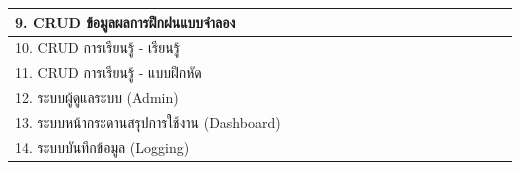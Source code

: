 \documentclass[12pt,oneside,openright,a4paper]{cpe-thai-project}
\begin{document}
\begin{enumerate}
\begin{table}[h]
\begin{tabular}{|lllll|llll|llll|llll|llll|}
\multicolumn{5}{|l|}{\cellcolor[HTML]{FFFFFF}9. CRUD ข้อมูลผลการฝึกฝนแบบจำลอง} & \multicolumn{1}{l|}{} & \multicolumn{1}{l|}{} & \multicolumn{1}{l|}{} &  & \multicolumn{1}{l|}{\cellcolor[HTML]{C0C0C0}} & \multicolumn{1}{l|}{\cellcolor[HTML]{C0C0C0}} & \multicolumn{1}{l|}{} &  & \multicolumn{1}{l|}{} & \multicolumn{1}{l|}{} & \multicolumn{1}{l|}{} &  & \multicolumn{1}{l|}{} & \multicolumn{1}{l|}{} & \multicolumn{1}{l|}{} &  \\ \hline
\multicolumn{5}{|l|}{\cellcolor[HTML]{FFFFFF}10. CRUD การเรียนรู้ - เรียนรู้} & \multicolumn{1}{l|}{} & \multicolumn{1}{l|}{} & \multicolumn{1}{l|}{} &  & \multicolumn{1}{l|}{} & \multicolumn{1}{l|}{} & \multicolumn{1}{l|}{\cellcolor[HTML]{C0C0C0}} &  & \multicolumn{1}{l|}{} & \multicolumn{1}{l|}{} & \multicolumn{1}{l|}{} &  & \multicolumn{1}{l|}{} & \multicolumn{1}{l|}{} & \multicolumn{1}{l|}{} &  \\ \hline
\multicolumn{5}{|l|}{\cellcolor[HTML]{FFFFFF}11. CRUD การเรียนรู้ - แบบฝึกหัด} & \multicolumn{1}{l|}{} & \multicolumn{1}{l|}{} & \multicolumn{1}{l|}{} &  & \multicolumn{1}{l|}{} & \multicolumn{1}{l|}{} & \multicolumn{1}{l|}{\cellcolor[HTML]{C0C0C0}} & \cellcolor[HTML]{C0C0C0} & \multicolumn{1}{l|}{} & \multicolumn{1}{l|}{} & \multicolumn{1}{l|}{} &  & \multicolumn{1}{l|}{} & \multicolumn{1}{l|}{} & \multicolumn{1}{l|}{} &  \\ \hline
\multicolumn{5}{|l|}{\cellcolor[HTML]{FFFFFF}12. ระบบผู้ดูแลระบบ (Admin)} & \multicolumn{1}{l|}{} & \multicolumn{1}{l|}{} & \multicolumn{1}{l|}{} &  & \multicolumn{1}{l|}{} & \multicolumn{1}{l|}{} & \multicolumn{1}{l|}{} &  & \multicolumn{1}{l|}{\cellcolor[HTML]{C0C0C0}} & \multicolumn{1}{l|}{\cellcolor[HTML]{C0C0C0}} & \multicolumn{1}{l|}{\cellcolor[HTML]{C0C0C0}} &  & \multicolumn{1}{l|}{} & \multicolumn{1}{l|}{} & \multicolumn{1}{l|}{} &  \\ \hline
\multicolumn{5}{|l|}{\cellcolor[HTML]{FFFFFF}13. ระบบหน้ากระดานสรุปการใช้งาน (Dashboard)} & \multicolumn{1}{l|}{} & \multicolumn{1}{l|}{} & \multicolumn{1}{l|}{} &  & \multicolumn{1}{l|}{} & \multicolumn{1}{l|}{} & \multicolumn{1}{l|}{} &  & \multicolumn{1}{l|}{} & \multicolumn{1}{l|}{} & \multicolumn{1}{l|}{\cellcolor[HTML]{C0C0C0}} & \cellcolor[HTML]{C0C0C0} & \multicolumn{1}{l|}{} & \multicolumn{1}{l|}{} & \multicolumn{1}{l|}{} &  \\ \hline
\multicolumn{5}{|l|}{\cellcolor[HTML]{FFFFFF}14. ระบบบันทึกข้อมูล (Logging)} & \multicolumn{1}{l|}{} & \multicolumn{1}{l|}{} & \multicolumn{1}{l|}{} &  & \multicolumn{1}{l|}{} & \multicolumn{1}{l|}{} & \multicolumn{1}{l|}{} &  & \multicolumn{1}{l|}{} & \multicolumn{1}{l|}{} & \multicolumn{1}{l|}{} & \cellcolor[HTML]{C0C0C0} & \multicolumn{1}{l|}{\cellcolor[HTML]{C0C0C0}} & \multicolumn{1}{l|}{} & \multicolumn{1}{l|}{} &  \\ \hline

\end{tabular}
\end{table}
\end{enumerate}
\end{document}
